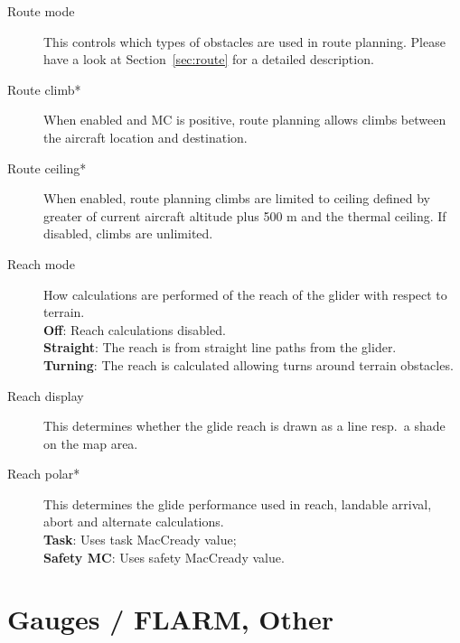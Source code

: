 \begin{description}
\item[Route mode]  \label{conf:routemode} This controls which types
  of obstacles are used in route planning. Please have a look at Section~\ref{sec:route} 
  for a detailed description.
\item[Route climb*]  \label{conf:routeclimb} When enabled and MC is positive, route 
  planning allows climbs between the aircraft location and destination.
\item[Route ceiling*]  \label{conf:routeceiling} When enabled, route planning climbs 
  are limited to ceiling defined by greater of current aircraft altitude plus 
  500 m and the thermal ceiling.  If disabled, climbs are unlimited.
\\
\item[Reach mode]  \label{conf:turningreach} How calculations are performed of 
  the reach of the glider with respect to terrain. \\
  {\bf Off}: Reach calculations disabled. \\
  {\bf Straight}: The reach is from straight line paths from the glider. \\
  {\bf Turning}: The reach is calculated allowing turns around terrain obstacles.
\item[Reach display]  \label{conf:gliderange} This determines whether the
glide reach is drawn as a line resp.\ a shade on the map area.
\item[Reach polar*]  \label{conf:reachpolar} This determines the glide performance 
  used in reach, landable arrival, abort and alternate calculations. \\
  {\bf Task}: Uses task MacCready value; \\
  {\bf Safety MC}: Uses safety MacCready value.
\end{description}


\section{Gauges / FLARM, Other} \label{sec:flarmandother-gauge}

